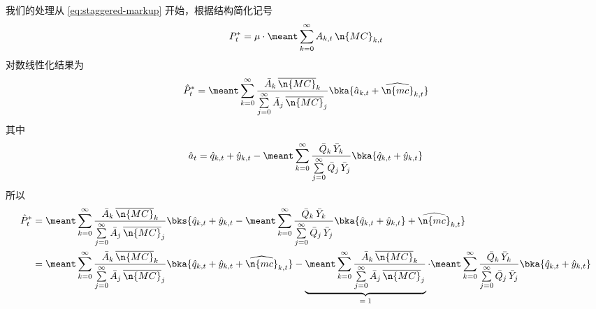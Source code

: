 我们的处理从 \ref{eq:staggered-markup} 开始，根据结构简化记号
\begin{align*}
    P^*_t=\mu\cdot\meant\sum^\infty_{k=0}A_{k,t}\,\n{MC}_{k,t}
\end{align*}
对数线性化结果为
\begin{align*}
    \hat P^*_t=\meant\sum^\infty_{k=0}\dfrac{\bar A_k\,\overline{\n{MC}}_k}{\sum\limits^{\infty}_{j=0}\bar A_j\,\overline{\n{MC}}_j}\bka{\hat a_{k,t}+\widehat{\n{mc}}_{k,t}}
\end{align*}
其中
\begin{align*}
    \hat a_t=\hat q_{k,t}+\hat y_{k,t}-\meant\sum^\infty_{k=0}\dfrac{\bar Q_k\,\bar Y_k}{\sum\limits^{\infty}_{j=0}\bar Q_j\,\bar Y_j}\bka{\hat q_{k,t}+\hat y_{k,t}}
\end{align*}
所以
\begin{align*}
    \hat P^*_t&=\meant\sum^\infty_{k=0}\dfrac{\bar A_k\,\overline{\n{MC}}_k}{\sum\limits^{\infty}_{j=0}\bar A_j\,\overline{\n{MC}}_j}\bks{\hat q_{k,t}+\hat y_{k,t}-\meant\sum^\infty_{k=0}\dfrac{\bar Q_k\,\bar Y_k}{\sum\limits^{\infty}_{j=0}\bar Q_j\,\bar Y_j}\bka{\hat q_{k,t}+\hat y_{k,t}}+\widehat{\n{mc}}_{k,t}}\\
    &=\meant\sum^\infty_{k=0}\dfrac{\bar A_k\,\overline{\n{MC}}_k}{\sum\limits^{\infty}_{j=0}\bar A_j\,\overline{\n{MC}}_j}\bka{\hat q_{k,t}+\hat y_{k,t}+\widehat{\n{mc}}_{k,t}}-\underbrace{\meant\sum^\infty_{k=0}\dfrac{\bar A_k\,\overline{\n{MC}}_k}{\sum\limits^{\infty}_{j=0}\bar A_j\,\overline{\n{MC}}_j}}_{= \; 1}\cdot\meant\sum^\infty_{k=0}\dfrac{\bar Q_k\,\bar Y_k}{\sum\limits^{\infty}_{j=0}\bar Q_j\,\bar Y_j}\bka{\hat q_{k,t}+\hat y_{k,t}}
\end{align*}



\SymmetricGeometry
